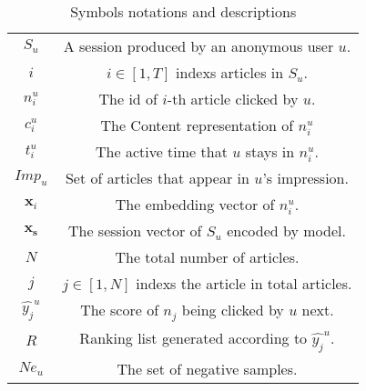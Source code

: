 \begin{table}
    \caption{Symbols notations and descriptions}
    \begin{tabular}{cc}
    \toprule
    $S_u$ & A session produced by an anonymous user $u$.\\
    $i$ & $i\in [1,T]$ indexs articles in $S_u$.\\
    $n_i^u$ & The id of $i$-th article clicked by $u$.\\
    $c_i^u$ & The Content representation of $n_i^u$ \\
    $t_i^u$ & The active time that $u$ stays in $n_i^u$. \\
    $Imp_u$ & Set of articles that appear in $u$'s impression.\\
    $\mathbf{x}_i$ & The embedding vector of $n_i^u$.\\
    $\mathbf{x_s}$ & The session vector of $S_u$ encoded by model.\\
    $N$ & The total number of articles.\\
    $j$ & $j\in [1,N]$ indexs the article in total articles.\\
    $\hat{y_j}^u$ & The score of $n_j$ being clicked by $u$ next.\\
    $R$ & Ranking list generated according to $\hat{y_j}^u$.\\
    $Ne_u$ & The set of negative samples.\\
    \bottomrule
    \end{tabular}
    \label{tb:note}
\end{table}

